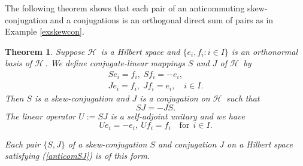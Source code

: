 \documentclass[12pt]{amsart}
\newtheorem{thm}{Theorem}
\theoremstyle{definition}
\newcommand{\cH}{\mathcal{H}\,}
\begin{document}
The following theorem shows that each pair of an anticommuting skew-conjugation and  a conjugations is an orthogonal direct sum of  pairs as in Example \ref{exskewcon}.
\begin{thm}\label{rev18aa}
Suppose  $\cH$ is a Hilbert space and $\{e_i,f_i:i\in I\}$ is an orthonormal basis of $\cH$. We define conjugate-linear mappings $S$ and $J$ of $\cH$ by
\begin{equation}\label{rev18bb}
\begin{array}{l}
 Se_i=f_i,\; Sf_i=-e_i,\\[2mm]
  Je_i=f_i, \; Jf_i=e_i,\quad i\in I.
  \end{array}
\end{equation}
Then  $S$ is a skew-conjugation and $J$ is a conjugation on $\cH$ such that
\begin{equation}\label{anticomSJ}
SJ=-JS.
\end{equation}
The linear operator $U:=SJ$ is a self-adjoint unitary and we have
\begin{equation*}
Ue_i=-e_i,~  Uf_i=f_i \quad\textrm{for}~~  i\in I.
\end{equation*}

Each pair $\{S,J\}$ of a skew-conjugation $S$ and conjugation $J$ on a Hilbert space  satisfying (\ref{anticomSJ}) is of this form.
\end{thm}
\end{document}
